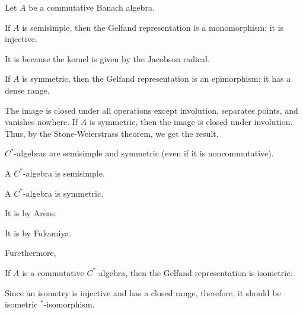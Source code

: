 \documentclass{../crs}
\begin{document}
Let $A$ be a commutative Banach algebra.
\begin{thm}
If $A$ is semisimple, then the Gelfand representation is a monomorphism; it is injective.
\end{thm}
\begin{pf}
It is because the kernel is given by the Jacobson radical.
\end{pf}
\begin{thm}
If $A$ is symmetric, then the Gelfand representation is an epimorphism; it has a dense range.
\end{thm}
\begin{pf}
The image is closed under all operations except involution, separates points, and vanishes nowhere.
If $A$ is symmetric, then the image is closed under involution.
Thus, by the Stone-Weierstrass theorem, we get the result.
\end{pf}

$C^*$-algebras are semisimple and symmetric (even if it is noncommutative).
\begin{thm}
A $C^*$-algebra is semisimple.
\end{thm}
\begin{thm}
A $C^*$-algebra is symmetric.
\end{thm}
\begin{pf}[1]
It is by Arens.
\end{pf}
\begin{pf}[2]
It is by Fukamiya.
\end{pf}
Furethermore,
\begin{thm}
If $A$ is a commutative $C^*$-algebra, then the Gelfand representation is isometric.
\end{thm}
Since an isometry is injective and has a closed range, therefore, it should be isometric $^*$-isomorphism.
\end{document}
